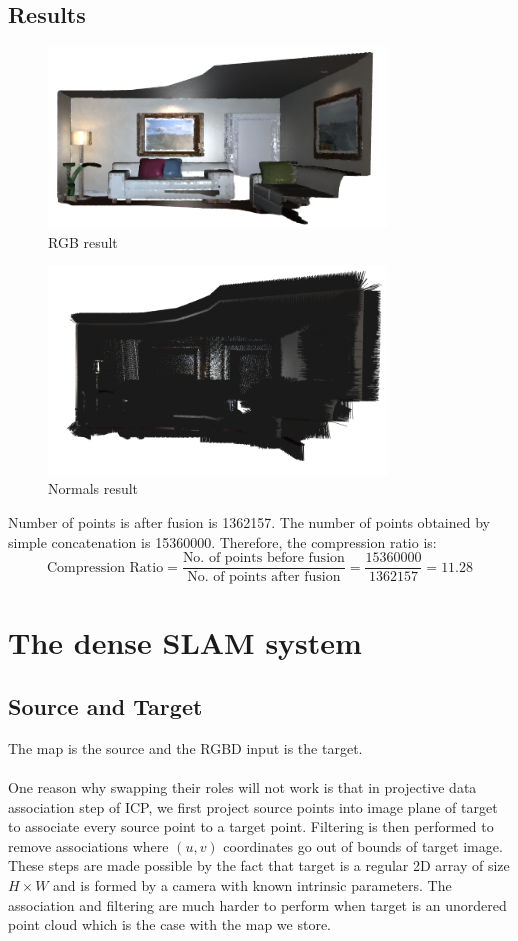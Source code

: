 \documentclass[12pt, a4paper]{article}
\begin{document}
\subsection{Results}
\begin{figure}[H]
  \centering
  \includegraphics[width=0.8\textwidth]{./results/fusion/rgb.png}
  \caption{RGB result}
\end{figure}
\begin{figure}[H]
  \centering
  \includegraphics[width=0.8\textwidth]{./results/fusion/normals.png}
  \caption{Normals result}
\end{figure}
Number of points is after fusion is 1362157. The number of points obtained by simple concatenation is 15360000. Therefore, the compression ratio is:
\[\text{Compression Ratio} = \frac{\text{No. of points before fusion}}{\text{No. of points after fusion}} = \frac{15360000}{1362157} = 11.28\]
\section{The dense SLAM system}
\subsection{Source and Target}
The map is the source and the RGBD input is the target.\\\\
One reason why swapping their roles will not work is that in projective data association step of ICP, we first project source points into image plane of target to associate every source point to a target point. Filtering is then performed to remove associations where $(u, v)$ coordinates go out of bounds of target image. These steps are made possible by the fact that target is a regular 2D array of size $H\times W$ and is formed by a camera with known intrinsic parameters. The association and filtering are much harder to perform when target is an unordered point cloud which is the case with the map we store.
\end{document}
